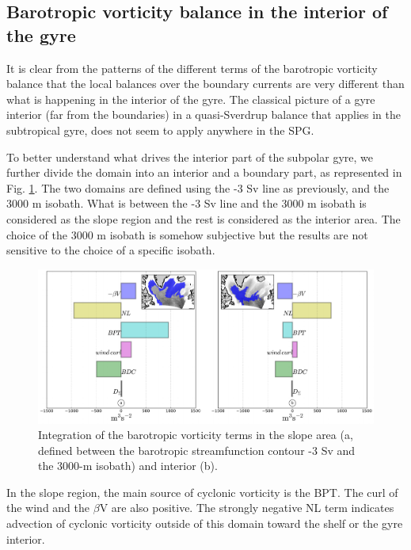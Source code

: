 \documentclass[os, manuscript]{copernicus}
\providecommand{\DIFaddend}{} %
\begin{document}
\DIFaddend \subsection{Barotropic vorticity balance in the interior of the gyre}

It is clear from the patterns of the different terms of the barotropic vorticity balance that the local balances over the boundary currents are very different than what is happening in the interior of the gyre. The classical picture of a gyre interior (far from the boundaries) in a quasi-Sverdrup balance that applies in the subtropical gyre,  does not seem to apply anywhere in the SPG. 

To better understand what drives the interior part of the subpolar gyre, we further divide the domain into an interior and a boundary part, as represented in Fig. \ref{f10}. The two domains are defined using the -3 Sv line as previously, and the 3000 m isobath. What is between the -3 Sv line and the 3000 m isobath is considered as the slope region and the rest is considered as the interior area. The choice of the 3000 m isobath is somehow subjective but the results are not sensitive to the choice of a specific isobath. 

\begin{figure}[t]
\includegraphics[width=14cm]{../fig_os/f10.pdf}
\caption{Integration of the barotropic vorticity terms in the slope area (a, defined between the barotropic streamfunction contour -3 Sv and the 3000-m isobath) and interior (b).}
\label{f10}
\end{figure} 

In the slope region, the main source of cyclonic vorticity is the BPT. The curl of the wind and the $\beta$V are also positive. The strongly negative NL term indicates advection of cyclonic vorticity outside of this domain toward the shelf or the gyre interior.
\end{document}
